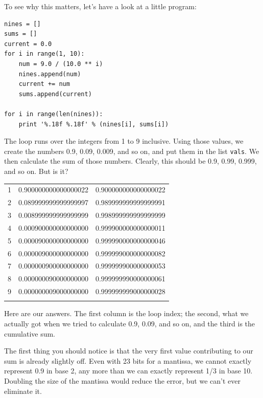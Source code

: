 \documentclass[]{book}
\begin{document}
To see why this matters, let's have a look at a little program:

\begin{verbatim}
nines = []
sums = []
current = 0.0
for i in range(1, 10):
    num = 9.0 / (10.0 ** i)
    nines.append(num)
    current += num
    sums.append(current)

for i in range(len(nines)):
    print '%.18f %.18f' % (nines[i], sums[i])
\end{verbatim}

The loop runs over the integers from 1 to 9 inclusive. Using those
values, we create the numbers 0.9, 0.09, 0.009, and so on, and put them
in the list \texttt{vals}. We then calculate the sum of those numbers.
Clearly, this should be 0.9, 0.99, 0.999, and so on. But is it?

\begin{longtable}[c]{@{}lll@{}}
\hline\noalign{\medskip}
1 & 0.900000000000000022 & 0.900000000000000022
\\\noalign{\medskip}
2 & 0.089999999999999997 & 0.989999999999999991
\\\noalign{\medskip}
3 & 0.008999999999999999 & 0.998999999999999999
\\\noalign{\medskip}
4 & 0.000900000000000000 & 0.999900000000000011
\\\noalign{\medskip}
5 & 0.000090000000000000 & 0.999990000000000046
\\\noalign{\medskip}
6 & 0.000009000000000000 & 0.999999000000000082
\\\noalign{\medskip}
7 & 0.000000900000000000 & 0.999999900000000053
\\\noalign{\medskip}
8 & 0.000000090000000000 & 0.999999990000000061
\\\noalign{\medskip}
9 & 0.000000009000000000 & 0.999999999000000028
\\\noalign{\medskip}
\hline
\end{longtable}

Here are our answers. The first column is the loop index; the second,
what we actually got when we tried to calculate 0.9, 0.09, and so on,
and the third is the cumulative sum.

The first thing you should notice is that the very first value
contributing to our sum is already slightly off. Even with 23 bits for a
mantissa, we cannot exactly represent 0.9 in base 2, any more than we
can exactly represent 1/3 in base 10. Doubling the size of the mantissa
would reduce the error, but we can't ever eliminate it.
\end{document}
